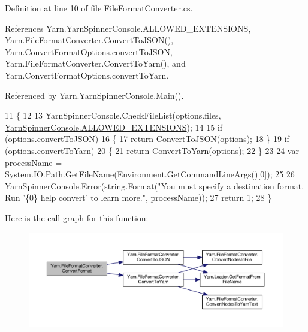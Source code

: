 Definition at line 10 of file File\-Format\-Converter.\-cs.



References Yarn.\-Yarn\-Spinner\-Console.\-A\-L\-L\-O\-W\-E\-D\-\_\-\-E\-X\-T\-E\-N\-S\-I\-O\-N\-S, Yarn.\-File\-Format\-Converter.\-Convert\-To\-J\-S\-O\-N(), Yarn.\-Convert\-Format\-Options.\-convert\-To\-J\-S\-O\-N, Yarn.\-File\-Format\-Converter.\-Convert\-To\-Yarn(), and Yarn.\-Convert\-Format\-Options.\-convert\-To\-Yarn.



Referenced by Yarn.\-Yarn\-Spinner\-Console.\-Main().


\begin{DoxyCode}
11         \{
12 
13             YarnSpinnerConsole.CheckFileList(options.files, 
      \hyperlink{a00185_a0979de7ea02c8c0375b8220a12e6575e}{YarnSpinnerConsole.ALLOWED\_EXTENSIONS});
14 
15             \textcolor{keywordflow}{if} (options.convertToJSON)
16             \{
17                 \textcolor{keywordflow}{return} \hyperlink{a00095_a28a086a7b44ecea7430af40436f38df6}{ConvertToJSON}(options);
18             \}
19             \textcolor{keywordflow}{if} (options.convertToYarn)
20             \{
21                 \textcolor{keywordflow}{return} \hyperlink{a00095_a1e6cd39b0c813f21da278367dcff76d2}{ConvertToYarn}(options);
22             \}
23 
24             var processName = System.IO.Path.GetFileName(Environment.GetCommandLineArgs()[0]);
25 
26             YarnSpinnerConsole.Error(string.Format(\textcolor{stringliteral}{"You must specify a destination format. Run '\{0\} help
       convert' to learn more."}, processName));
27             \textcolor{keywordflow}{return} 1;
28         \}
\end{DoxyCode}


Here is the call graph for this function\-:
\nopagebreak
\begin{figure}[H]
\begin{center}
\leavevmode
\includegraphics[width=350pt]{a00095_aa4db4ccac799c5f047a8b1a9efbe109d_cgraph}
\end{center}
\end{figure}




